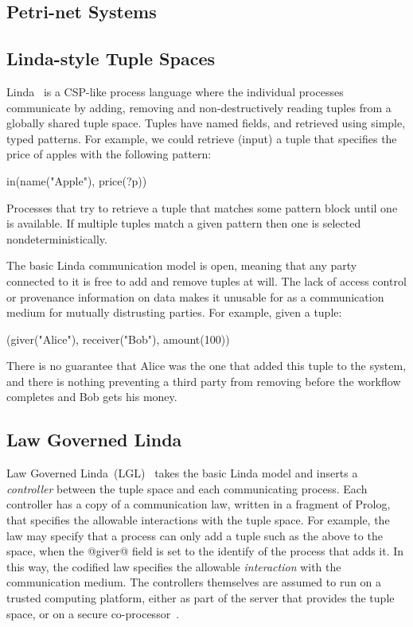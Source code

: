 \subsection{Petri-net Systems}



\subsection{Linda-style Tuple Spaces}
Linda~\cite{Gelernter1985:Linda} is a CSP-like process language where the individual processes communicate by adding, removing and non-destructively reading tuples from a globally shared tuple space. Tuples have named fields, and retrieved using simple, typed patterns. For example, we could retrieve (input) a tuple that specifies the price of apples with the following pattern:
\begin{code}
   in(name("Apple"), price(?p))
\end{code}
Processes that try to retrieve a tuple that matches some pattern block until one is available. If multiple tuples match a given pattern then one is selected nondeterministically.

The basic Linda communication model is open, meaning that any party connected to it is free to add and remove tuples at will. The lack of access control or provenance information on data makes it unusable for as a communication medium for mutually distrusting parties. For example, given a tuple:
\begin{code}
   (giver("Alice"), receiver("Bob"), amount(100))
\end{code}
There is no guarantee that Alice was the one that added this tuple to the system, and there is nothing preventing a third party from removing before the workflow completes and Bob gets his money.

\subsection{Law Governed Linda}
Law Governed Linda~(LGL)~\cite{Minsky1994:LawGovernedLinda, Minsky2001:SafeTupleSpace} takes the basic Linda model and inserts a \emph{controller} between the tuple space and each communicating process. Each controller has a copy of a communication law, written in a fragment of Prolog, that specifies the allowable interactions with the tuple space. For example, the law may specify that a process can only add a tuple such as the above to the space, when the @giver@ field is set to the identify of the process that adds it. In this way, the codified law specifies the allowable \emph{interaction} with the communication medium. The controllers themselves are assumed to run on a trusted computing platform, either as part of the server that provides the tuple space, or on a secure co-processor~\cite{Minsky2001:SafeTupleSpace}.

